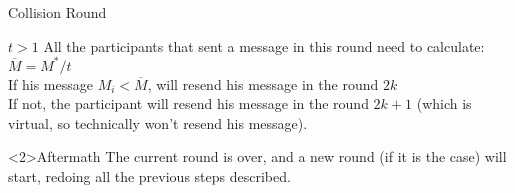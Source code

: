 \begin{frame}{Collision Round}
    \begin{block}{$t > 1$}
        All the participants that sent a message in this round need to calculate: $\overline{M} = M^*/t$\\
        If his message $M_i < \overline{M}$, will resend his message in the round $2k$\\
        If not, the participant will resend his message in the round $2k+1$ (which is virtual, so technically won't resend his message).
    \end{block}
    \begin{block}<2>{Aftermath}
        The current round is over, and a new round (if it is the case) will start, redoing all the previous steps described.
    \end{block}
\end{frame}